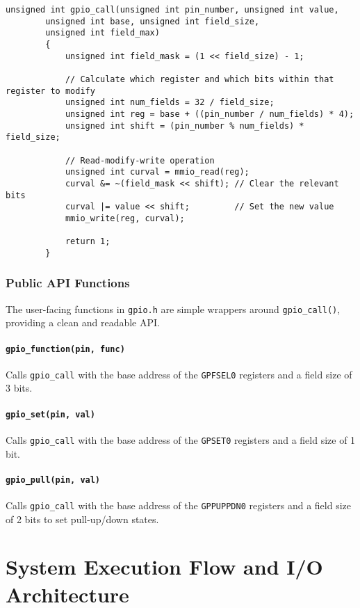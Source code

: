 \documentclass[a4paper, 11pt]{article}
\begin{document}
	\begin{lstlisting}[style=cstyle, caption={The generic gpio\_call function.}]
		unsigned int gpio_call(unsigned int pin_number, unsigned int value, 
		unsigned int base, unsigned int field_size, 
		unsigned int field_max) 
		{
			unsigned int field_mask = (1 << field_size) - 1;
			
			// Calculate which register and which bits within that register to modify
			unsigned int num_fields = 32 / field_size;
			unsigned int reg = base + ((pin_number / num_fields) * 4);
			unsigned int shift = (pin_number % num_fields) * field_size;
			
			// Read-modify-write operation
			unsigned int curval = mmio_read(reg);
			curval &= ~(field_mask << shift); // Clear the relevant bits
			curval |= value << shift;         // Set the new value
			mmio_write(reg, curval);
			
			return 1;
		}
	\end{lstlisting}
	
	\subsubsection{Public API Functions}
	The user-facing functions in \texttt{gpio.h} are simple wrappers around \texttt{gpio\_call()}, providing a clean and readable API.
	
	\paragraph{\texttt{gpio\_function(pin, func)}} Calls \texttt{gpio\_call} with the base address of the \texttt{GPFSEL0} registers and a field size of 3 bits.
	
	\paragraph{\texttt{gpio\_set(pin, val)}} Calls \texttt{gpio\_call} with the base address of the \texttt{GPSET0} registers and a field size of 1 bit.
	
	\paragraph{\texttt{gpio\_pull(pin, val)}} Calls \texttt{gpio\_call} with the base address of the \texttt{GPPUPPDN0} registers and a field size of 2 bits to set pull-up/down states.
	
	
	
	\section{System Execution Flow and I/O Architecture}
	\label{sec:flow}
	
\end{document}
